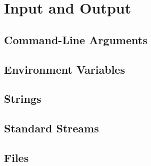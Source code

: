 \chapter{Input and Output}

\section{Command-Line Arguments}
\csharpsubsection{\csharp}

\section{Environment Variables}
\csharpsubsection{\csharp}

\section{Strings}
\label{sec:io:strings}
\csharpsubsection{\csharp}

\section{Standard Streams}
\csharpsubsection{\csharp}

\section{Files}
\csharpsubsection{\csharp}

